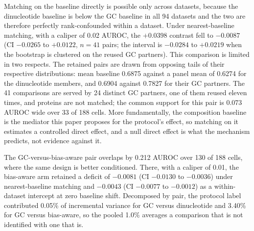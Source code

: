 Matching on the baseline directly is possible only across datasets, because the dinucleotide
baseline is below the GC baseline in all 94 datasets and the two are therefore perfectly
rank-confounded within a dataset. Under nearest-baseline matching, with a caliper of 0.02
AUROC, the $+0.0398$ contrast fell to $-0.0087$ (CI $-0.0265$ to $+0.0122$, $n=41$ pairs; the
interval is $-0.0284$ to $+0.0219$ when the bootstrap is clustered on the reused GC partners).
This comparison is limited in two respects. The retained
pairs are drawn from opposing tails of their respective distributions: mean baseline 0.6875
against a panel mean of 0.6274 for the dinucleotide members, and 0.6904 against 0.7827 for their
GC partners. The 41 comparisons are served by 24 distinct GC partners, one of them reused eleven
times, and proteins are not matched; the common support for this pair is 0.073 AUROC wide over
33 of 188 cells. More fundamentally, the composition baseline is the mediator this paper
proposes for the protocol's effect, so matching on it estimates a controlled direct effect, and
a null direct effect is what the mechanism predicts, not evidence against it.

The GC-versus-bias-aware pair overlaps by 0.212 AUROC over 130 of 188 cells, where the same
design is better conditioned. There, with a caliper of 0.01, the bias-aware arm retained a
deficit of $-0.0081$ (CI $-0.0130$ to $-0.0036$) under nearest-baseline matching and $-0.0043$
(CI $-0.0077$ to $-0.0012$) as a within-dataset intercept at zero baseline shift. Decomposed by
pair, the protocol label contributed 0.05\% of incremental variance for GC versus dinucleotide
and 3.40\% for GC versus bias-aware, so the pooled 1.0\% averages a comparison that is not
identified with one that is.

